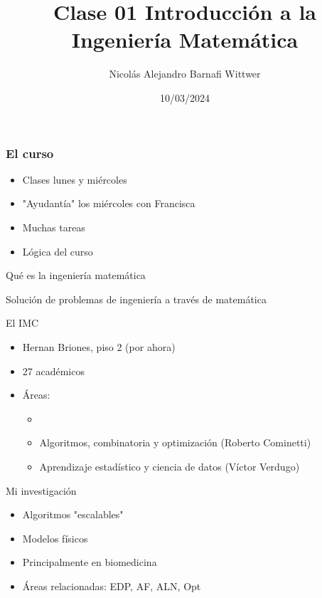 \documentclass[14pt,aspectratio=169,xcolor=dvipsnames]{beamer}
\title[short title]{Clase 01 Introducción a la Ingeniería Matemática}
\subtitle{}
\author[NA Barnafi] {Nicolás Alejandro Barnafi Wittwer}
\institute[UC|CMM] 
{
    Pontificia Universidad Católica de Chile \\
    Centro de Modelamiento Matemático
}
\date{10/03/2024}
\begin{document}
\begin{frame}
    \maketitle
\end{frame}
\begin{frame}\frametitle{El curso}
    \begin{itemize}
        \item Clases lunes y miércoles
        \item "Ayudantía" los miércoles con Francisca
        \item Muchas tareas
        \item Lógica del curso
    \end{itemize}
\end{frame}
\begin{frame}{Qué es la ingeniería matemática}
    \pause
    \begin{block}{}
        Solución de problemas de ingeniería a través de matemática
    \end{block}
\end{frame}
\begin{frame}{El IMC}
    \begin{itemize}
        \item Hernan Briones, piso 2 (por ahora)
        \item 27 académicos
        \item Áreas:
            \begin{itemize}
                \item {}
                \item Algoritmos, combinatoria y optimización (Roberto Cominetti)
                \item Aprendizaje estadístico y ciencia de datos (Víctor Verdugo)
            \end{itemize}
    \end{itemize}
\end{frame}
\begin{frame}{Mi investigación}
    \begin{itemize}
        \item Algoritmos "escalables"
        \item Modelos físicos
        \item Principalmente en biomedicina
        \item Áreas relacionadas: EDP, AF, ALN, Opt
    \end{itemize}
\end{frame}
\end{document}

